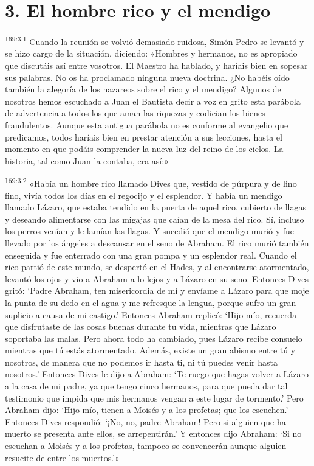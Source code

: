 \section*{3. El hombre rico y el mendigo}
\par 
\textsuperscript{169:3.1} Cuando la reunión se volvió demasiado ruidosa, Simón Pedro se levantó y se hizo cargo de la situación, diciendo: «Hombres y hermanos, no es apropiado que discutáis así entre vosotros. El Maestro ha hablado, y haríais bien en sopesar sus palabras. No os ha proclamado ninguna nueva doctrina. ¿No habéis oído también la alegoría de los nazareos sobre el rico y el mendigo? Algunos de nosotros hemos escuchado a Juan el Bautista decir a voz en grito esta parábola de advertencia a todos los que aman las riquezas y codician los bienes fraudulentos. Aunque esta antigua parábola no es conforme al evangelio que predicamos, todos haríais bien en prestar atención a sus lecciones, hasta el momento en que podáis comprender la nueva luz del reino de los cielos. La historia, tal como Juan la contaba, era así:»

\par 
\textsuperscript{169:3.2} «Había un hombre rico llamado Dives que, vestido de púrpura y de lino fino, vivía todos los días en el regocijo y el esplendor. Y había un mendigo llamado Lázaro, que estaba tendido en la puerta de aquel rico, cubierto de llagas y deseando alimentarse con las migajas que caían de la mesa del rico. Sí, incluso los perros venían y le lamían las llagas. Y sucedió que el mendigo murió y fue llevado por los ángeles a descansar en el seno de Abraham. El rico murió también enseguida y fue enterrado con una gran pompa y un esplendor real. Cuando el rico partió de este mundo, se despertó en el Hades, y al encontrarse atormentado, levantó los ojos y vio a Abraham a lo lejos y a Lázaro en su seno. Entonces Dives gritó: `Padre Abraham, ten misericordia de mí y envíame a Lázaro para que moje la punta de su dedo en el agua y me refresque la lengua, porque sufro un gran suplicio a causa de mi castigo.' Entonces Abraham replicó: `Hijo mío, recuerda que disfrutaste de las cosas buenas durante tu vida, mientras que Lázaro soportaba las malas. Pero ahora todo ha cambiado, pues Lázaro recibe consuelo mientras que tú estás atormentado. Además, existe un gran abismo entre tú y nosotros, de manera que no podemos ir hasta ti, ni tú puedes venir hasta nosotros.' Entonces Dives le dijo a Abraham: `Te ruego que hagas volver a Lázaro a la casa de mi padre, ya que tengo cinco hermanos, para que pueda dar tal testimonio que impida que mis hermanos vengan a este lugar de tormento.' Pero Abraham dijo: {}`Hijo mío, tienen a Moisés y a los profetas; que los escuchen.' Entonces Dives respondió: `¡No, no, padre Abraham! Pero si alguien que ha muerto se presenta ante ellos, se arrepentirán.' Y entonces dijo Abraham: `Si no escuchan a Moisés y a los profetas, tampoco se convencerán aunque alguien resucite de entre los muertos.'»

